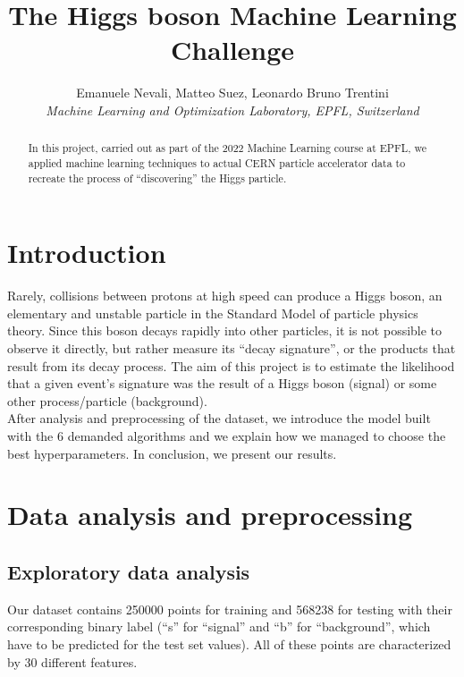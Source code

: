 \documentclass[10pt,conference,compsocconf]{IEEEtran}
\begin{document}
\title{The Higgs boson Machine Learning Challenge}

\author{
  Emanuele Nevali, Matteo Suez, Leonardo Bruno Trentini\\
  \textit{Machine Learning and Optimization Laboratory, EPFL, Switzerland}
}

\maketitle

\begin{abstract}
In this project, carried out as part of the 2022 Machine Learning course at EPFL, we applied machine learning techniques to actual CERN particle accelerator data to recreate the process of
“discovering” the Higgs particle.\\
\end{abstract}

\section{Introduction}
Rarely, collisions between protons at high speed can produce a Higgs boson, an elementary and unstable particle in the Standard Model of particle physics theory\cite{faq}. Since this boson decays rapidly into other particles, it is not possible to observe it directly, but rather measure its “decay signature”, or the products that result from its decay process. The aim of this project is to estimate the likelihood that a given event’s signature was the result of a Higgs boson (signal) or some other process/particle (background).\\
After analysis and preprocessing of the dataset, we introduce the model built with the 6 demanded algorithms and we explain how we managed to choose the best hyperparameters. In conclusion, we present our results.

\section{Data analysis and preprocessing}

\subsection{Exploratory data analysis}
Our dataset contains 250000 points for training and 568238
for testing with their corresponding binary label (“s” for “signal” and “b” for “background”, which have to be predicted for the test set values). All of these points are characterized by 30 different features. \\
\vspace{-0.8cm}\\
\end{document}
